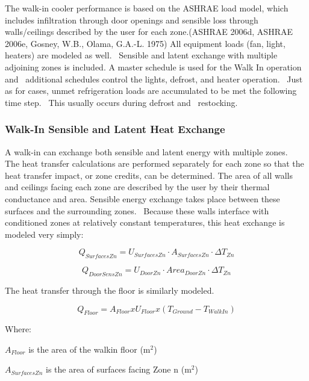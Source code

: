 The walk-in cooler performance is based on the ASHRAE load model, which includes infiltration through door openings and sensible loss through walls/ceilings described by the user for each zone.(ASHRAE 2006d, ASHRAE 2006e, Gosney, W.B., Olama, G.A.-L. 1975) All equipment loads (fan, light, heaters) are modeled as well.~ Sensible and latent exchange with multiple adjoining zones is included. A master schedule is used for the Walk In operation and~ additional schedules control the lights, defrost, and heater operation. ~Just as for cases, unmet refrigeration loads are accumulated to be met the following time step.~ This usually occurs during defrost and ~restocking.

\subsubsection{Walk-In Sensible and Latent Heat Exchange}\label{walk-in-sensible-and-latent-heat-exchange}

A walk-in can exchange both sensible and latent energy with multiple zones.~ The heat transfer calculations are performed separately for each zone so that the heat transfer impact, or zone credits, can be determined. The area of all walls and ceilings facing each zone are described by the user by their thermal conductance and area. Sensible energy exchange takes place between these surfaces and the surrounding zones.~ Because these walls interface with conditioned zones at relatively constant temperatures, this heat exchange is modeled very simply:

\begin{equation}
Q_{SurfacesZn} = U_{SurfacesZn} \cdot A_{SurfacesZn} \cdot \Delta T_{Zn}
\end{equation}

\begin{equation}
Q_{DoorSensZn} = U_{DoorZn} \cdot Area_{DoorZn} \cdot \Delta T_{Zn}
\end{equation}

The heat transfer through the floor is similarly modeled.

\begin{equation}
Q_{Floor} = A_{Floor} x U_{Floor} x (T_{Ground} - T_{WalkIn})
\end{equation}

Where:

\(A_{Floor}\) is the area of the walkin floor (m\(^{2}\))

\(A_{SurfacesZn}\) is the area of surfaces facing Zone n (m\(^{2}\))

